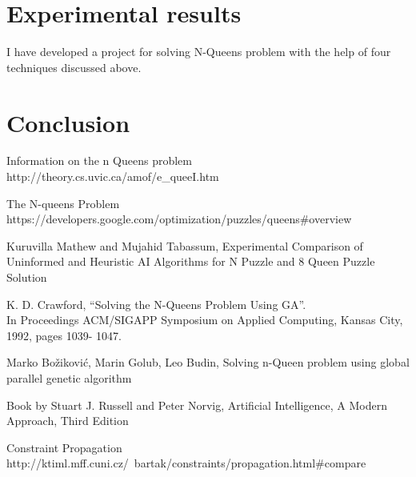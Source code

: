 \documentclass[conference]{IEEEtran}
\begin{document}

%
%
%

\section{Experimental results}

I have developed a project for solving N-Queens problem with the help of four techniques discussed above. 

\section{Conclusion}

\begin{thebibliography}{11}

Information on the n Queens problem
\\http://theory.cs.uvic.ca/amof/e\_queeI.htm

The N-queens Problem
\\https://developers.google.com/optimization/puzzles/queens\#overview

Kuruvilla Mathew and Mujahid Tabassum, Experimental Comparison of Uninformed and Heuristic AI Algorithms for N Puzzle and 8 Queen Puzzle Solution 

 K. D. Crawford, “Solving the N-Queens Problem Using GA”.\\  In  Proceedings  ACM/SIGAPP  Symposium  on Applied  Computing,  Kansas  City,  1992,  pages  1039- 1047. 
 
 Marko Božiković, Marin Golub, Leo Budin, Solving n-Queen problem using  global parallel genetic algorithm

Book by Stuart J. Russell and Peter Norvig, Artificial Intelligence, A Modern Approach, Third Edition 

Constraint Propagation
\\http://ktiml.mff.cuni.cz/~bartak/constraints/propagation.html\#compare


\end{thebibliography}

\end{document}
